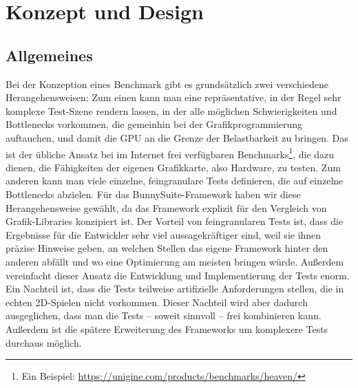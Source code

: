 \chapter{Konzept und Design}
\label{ch:konzept}
\section{Allgemeines}
Bei der Konzeption eines Benchmark gibt es grundsätzlich zwei verschiedene Herangehensweisen: Zum einen kann man eine repräsentative, in der Regel sehr komplexe Test-Szene rendern lassen, in der alle möglichen Schwierigkeiten und Bottlenecks vorkommen, die gemeinhin bei der Grafikprogrammierung auftauchen, und damit die GPU an die Grenze der Belastbarkeit zu bringen. Das ist der übliche Ansatz bei im Internet frei verfügbaren Benchmarks\footnote{Ein Beispiel: \url{https://unigine.com/products/benchmarks/heaven/}}, die dazu dienen, die Fähigkeiten der eigenen Grafikkarte, also Hardware, zu testen. Zum anderen kann man viele einzelne, feingranulare Tests definieren, die auf einzelne Bottlenecks abzielen. Für das BunnySuite-Framework haben wir diese Herangehensweise gewählt, da das Framework explizit für den Vergleich von Grafik-Libraries konzipiert ist. Der Vorteil von feingranularen Tests ist, dass die Ergebnisse für die Entwickler sehr viel aussagekräftiger sind, weil sie ihnen präzise Hinweise geben, an welchen Stellen das eigene Framework hinter den anderen abfällt und wo eine Optimierung am meisten bringen würde. Außerdem vereinfacht dieser Ansatz die Entwicklung und Implementierung der Tests enorm. Ein Nachteil ist, dass die Tests teilweise artifizielle Anforderungen stellen, die in echten 2D-Spielen nicht vorkommen. Dieser Nachteil wird aber dadurch ausgeglichen, dass man die Tests -- soweit sinnvoll -- frei kombinieren kann. Außerdem ist die spätere Erweiterung des Frameworks um komplexere Tests durchaus möglich.

